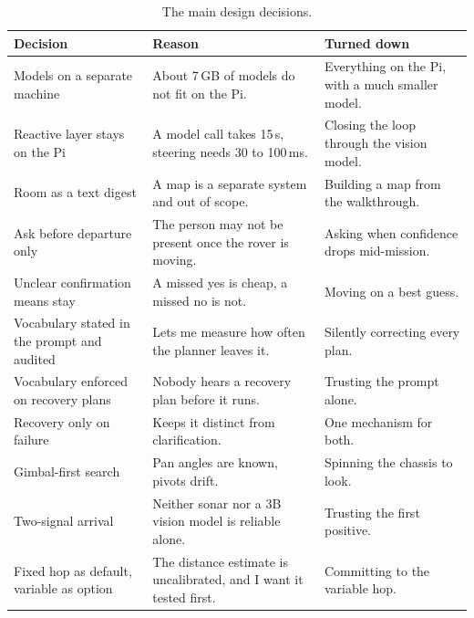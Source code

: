 \begin{table}[htbp]
  \centering
  \caption{The main design decisions.}
  \label{tab:decisions}
  \small
  \begin{tabular}{@{}p{3.6cm} p{5.6cm} p{4.0cm}@{}}
    \toprule
    Decision & Reason & Turned down \\
    \midrule
    Models on a separate machine & About 7\,GB of models do not fit on the Pi. & Everything on the Pi, with a much smaller model. \\
    Reactive layer stays on the Pi & A model call takes 15\,s, steering needs 30 to 100\,ms. & Closing the loop through the vision model. \\
    Room as a text digest & A map is a separate system and out of scope. & Building a map from the walkthrough. \\
    Ask before departure only & The person may not be present once the rover is moving. & Asking when confidence drops mid-mission. \\
    Unclear confirmation means stay & A missed yes is cheap, a missed no is not. & Moving on a best guess. \\
    Vocabulary stated in the prompt and audited & Lets me measure how often the planner leaves it. & Silently correcting every plan. \\
    Vocabulary enforced on recovery plans & Nobody hears a recovery plan before it runs. & Trusting the prompt alone. \\
    Recovery only on failure & Keeps it distinct from clarification. & One mechanism for both. \\
    Gimbal-first search & Pan angles are known, pivots drift. & Spinning the chassis to look. \\
    Two-signal arrival & Neither sonar nor a 3B vision model is reliable alone. & Trusting the first positive. \\
    Fixed hop as default, variable as option & The distance estimate is uncalibrated, and I want it tested first. & Committing to the variable hop. \\
    \bottomrule
  \end{tabular}
\end{table}

